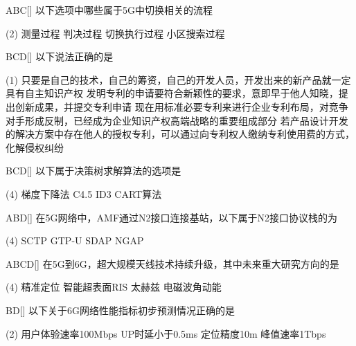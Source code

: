 \begin{choice}{\;ABC\;}[]
    以下选项中哪些属于5G中切换相关的流程
    \begin{tasks}(2)
        \task 测量过程
        \task 判决过程
        \task 切换执行过程
        \task 小区搜索过程
    \end{tasks}
\end{choice}

\begin{choice}{\;BCD\;}[]
    以下说法正确的是
    \begin{tasks}(1)
        \task 只要是自己的技术，自己的筹资，自己的开发人员，开发出来的新产品就一定具有自主知识产权
        \task 发明专利的申请要符合新颖性的要求，意即早于他人知晓，提出创新成果，并提交专利申请
        \task 现在用标准必要专利来进行企业专利布局，对竞争对手形成反制，已经成为企业知识产权高端战略的重要组成部分
        \task 若产品设计开发的解决方案中存在他人的授权专利，可以通过向专利权人缴纳专利使用费的方式，化解侵权纠纷
    \end{tasks}
\end{choice}

\begin{choice}{\;BCD\;}[]
    以下属于决策树求解算法的选项是
    \begin{tasks}(4)
        \task 梯度下降法
        \task C4.5
        \task ID3
        \task CART算法
    \end{tasks}
\end{choice}


\begin{choice}{\;ABD\;}[]
    在5G网络中，AMF通过N2接口连接基站，以下属于N2接口协议栈的为
    \begin{tasks}(4)
        \task SCTP
        \task GTP-U
        \task SDAP
        \task NGAP
    \end{tasks}
\end{choice}


\begin{choice}{\;ABCD\;}[]
    在5G到6G，超大规模天线技术持续升级，其中未来重大研究方向的是
    \begin{tasks}(4)
        \task 精准定位
        \task 智能超表面RIS
        \task 太赫兹
        \task 电磁波角动能
    \end{tasks}
\end{choice}


\begin{choice}{\;BD\;}[]
    以下关于6G网络性能指标初步预测情况正确的是
    \begin{tasks}(2)
        \task 用户体验速率100Mbps
        \task UP时延小于0.5ms
        \task 定位精度10m
        \task 峰值速率1Tbps
    \end{tasks}
\end{choice}


